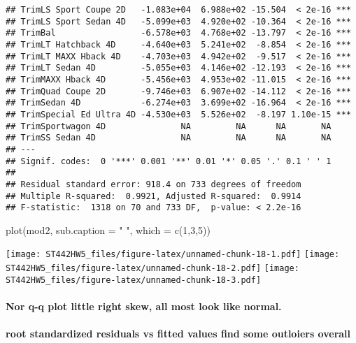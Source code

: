 \documentclass[
]{article}
\newenvironment{Shaded}{\begin{snugshade}}{\end{snugshade}}
\newcommand{\AttributeTok}[1]{\textcolor[rgb]{0.77,0.63,0.00}{#1}}
\newcommand{\DecValTok}[1]{\textcolor[rgb]{0.00,0.00,0.81}{#1}}
\newcommand{\FunctionTok}[1]{\textcolor[rgb]{0.00,0.00,0.00}{#1}}
\newcommand{\NormalTok}[1]{#1}
\newcommand{\StringTok}[1]{\textcolor[rgb]{0.31,0.60,0.02}{#1}}
\begin{document}
\begin{verbatim}
## TrimLS Sport Coupe 2D   -1.083e+04  6.988e+02 -15.504  < 2e-16 ***
## TrimLS Sport Sedan 4D   -5.099e+03  4.920e+02 -10.364  < 2e-16 ***
## TrimBal                 -6.578e+03  4.768e+02 -13.797  < 2e-16 ***
## TrimLT Hatchback 4D     -4.640e+03  5.241e+02  -8.854  < 2e-16 ***
## TrimLT MAXX Hback 4D    -4.703e+03  4.942e+02  -9.517  < 2e-16 ***
## TrimLT Sedan 4D         -5.055e+03  4.146e+02 -12.193  < 2e-16 ***
## TrimMAXX Hback 4D       -5.456e+03  4.953e+02 -11.015  < 2e-16 ***
## TrimQuad Coupe 2D       -9.746e+03  6.907e+02 -14.112  < 2e-16 ***
## TrimSedan 4D            -6.274e+03  3.699e+02 -16.964  < 2e-16 ***
## TrimSpecial Ed Ultra 4D -4.530e+03  5.526e+02  -8.197 1.10e-15 ***
## TrimSportwagon 4D               NA         NA      NA       NA    
## TrimSS Sedan 4D                 NA         NA      NA       NA    
## ---
## Signif. codes:  0 '***' 0.001 '**' 0.01 '*' 0.05 '.' 0.1 ' ' 1
## 
## Residual standard error: 918.4 on 733 degrees of freedom
## Multiple R-squared:  0.9921, Adjusted R-squared:  0.9914 
## F-statistic:  1318 on 70 and 733 DF,  p-value: < 2.2e-16
\end{verbatim}

\begin{Shaded}
\begin{Highlighting}[]
\FunctionTok{plot}\NormalTok{(mod2, }\AttributeTok{sub.caption =} \StringTok{" "}\NormalTok{, }\AttributeTok{which =} \FunctionTok{c}\NormalTok{(}\DecValTok{1}\NormalTok{,}\DecValTok{3}\NormalTok{,}\DecValTok{5}\NormalTok{))}
\end{Highlighting}
\end{Shaded}

\texttt{[image: ST442HW5\_files/figure-latex/unnamed-chunk-18-1.pdf]}
\texttt{[image: ST442HW5\_files/figure-latex/unnamed-chunk-18-2.pdf]}
\texttt{[image: ST442HW5\_files/figure-latex/unnamed-chunk-18-3.pdf]}

\hypertarget{nor-q-q-plot-little-right-skew-all-most-look-like-normal.}{%
\paragraph{Nor q-q plot little right skew, all most look like
normal.}\label{nor-q-q-plot-little-right-skew-all-most-look-like-normal.}}

\hypertarget{root-standardized-residuals-vs-fitted-values-find-some-outloiers-overall}{%
\paragraph{root standardized residuals vs fitted values find some
outloiers
overall}\label{root-standardized-residuals-vs-fitted-values-find-some-outloiers-overall}}
\end{document}
